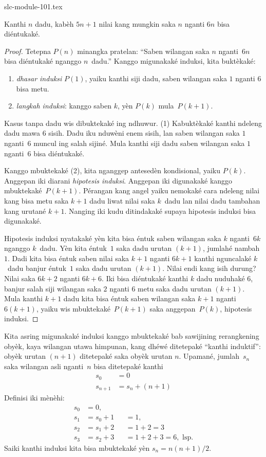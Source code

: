 \begin{filecontents*}[overwrite]{slc-module-101.tex}
\begin{thm}
  Kanthi $n$ dadu, kabèh $5n+1$ nilai
  kang mungkin saka $n$ nganti $6n$
  bisa diéntukaké.
\end{thm}

\begin{proof}
Tetepna $P(n)$ minangka pratelan:
``Saben wilangan saka $n$ nganti~$6n$
bisa diéntukaké nganggo $n$~dadu.''
Kanggo migunakaké induksi, kita buktèkaké:
\begin{enumerate}
\item \emph{dhasar induksi} $P(1)$,
  yaiku kanthi siji dadu, saben wilangan
  saka $1$ nganti $6$ bisa metu.
\item \emph{langkah induksi}: kanggo
  saben $k$, yèn $P(k)$ mula~$P(k+1)$.
\end{enumerate}

Kasus tanpa dadu wis dibuktekaké ing ndhuwur.
(1) Kabuktèkaké kanthi ndeleng dadu mawa
$6$ sisih. Dadu iku nduwèni enem sisih,
lan saben wilangan saka $1$ nganti~$6$
muncul ing salah sijiné. Mula kanthi siji
dadu saben wilangan saka $1$ nganti~$6$
bisa diéntukaké.

Kanggo mbuktekaké (2), kita nganggep
antesedèn kondisional, yaiku $P(k)$.
Anggepan iki diarani \emph{hipotesis induksi}.
Anggepan iki digunakaké kanggo mbuktekaké~$P(k+1)$.
Pérangan kang angel yaiku nemokaké cara
ndeleng nilai kang bisa metu saka $k+1$
dadu liwat nilai saka $k$~dadu lan nilai
dadu tambahan kang urutané $k+1$.
Nanging iki kudu ditindakaké supaya
hipotesis induksi bisa digunakaké.

Hipotesis induksi nyatakaké yèn kita
bisa éntuk saben wilangan saka $k$
nganti~$6k$ nganggo $k$~dadu.
Yèn kita éntuk~$1$ saka dadu urutan
$(k+1)$, jumlahé nambah $1$.
Dadi kita bisa éntuk saben nilai saka
$k+1$ nganti $6k+1$ kanthi nguncalaké
$k$~dadu banjur éntuk~$1$ saka
dadu urutan $(k+1)$. Nilai endi kang isih
durung? Nilai saka $6k+2$ nganti
$6k+6$. Iki bisa diéntukaké kanthi
$k$ dadu nuduhaké $6$, banjur
salah siji wilangan saka $2$ nganti
$6$ metu saka dadu urutan $(k+1)$.
Mula kanthi $k+1$ dadu kita
bisa éntuk saben wilangan saka $k+1$
nganti $6(k+1)$, yaiku
wis mbuktekaké~$P(k+1)$ saka
anggepan~$P(k)$, hipotesis induksi.
\end{proof}

Kita asring migunakaké induksi kanggo
mbuktekaké bab sawijining rerangkening
obyèk, kaya wilangan utawa himpunan,
kang dhéwé ditetepaké
``kanthi induktif'': obyèk urutan
$(n+1)$ ditetepaké saka obyèk
urutan $n$. Upamané, jumlah~$s_n$
saka wilangan asli nganti~$n$ bisa
ditetepaké kanthi
\begin{align*}
  s_0 & = 0\\
  s_{n+1} & = s_n + (n+1)
\end{align*}
Definisi iki mènèhi:
\begin{align*}
  s_0 & = 0,\\
  s_1 & = s_0 + 1 && = 1,\\
  s_2 & = s_1 + 2 && = 1 + 2 = 3\\
  s_3 & = s_2 + 3 && = 1 + 2 + 3 = 6, \text{ lsp.}
\end{align*}
Saiki kanthi induksi kita bisa
mbuktekaké yèn $s_n = n(n+1)/2$.


\end{filecontents*}

